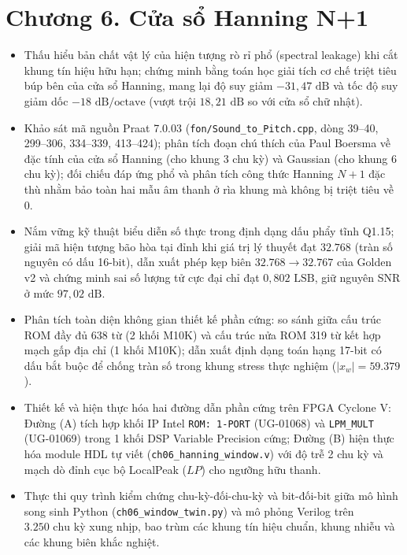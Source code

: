 \providecommand{\todo}[1]{\textcolor{red}{\textbf{[TODO: #1]}}}
\clearpage
{}
\section*{Chương 6. Cửa sổ Hanning N+1}

\begin{learningobj}
\begin{itemize}[leftmargin=1.5em, itemsep=2pt]
    \item Thấu hiểu bản chất vật lý của hiện tượng rò rỉ phổ (spectral leakage) khi cắt khung tín hiệu hữu hạn; chứng minh bằng toán học giải tích cơ chế triệt tiêu búp bên của cửa sổ Hanning, mang lại độ suy giảm $-31{,}47\text{ dB}$ và tốc độ suy giảm dốc $-18\text{ dB/octave}$ (vượt trội $18{,}21\text{ dB}$ so với cửa sổ chữ nhật).
    \item Khảo sát mã nguồn Praat 7.0.03 (\texttt{fon/Sound\_to\_Pitch.cpp}, dòng 39--40, 299--306, 334--339, 413--424); phân tích đoạn chú thích của Paul Boersma về đặc tính của cửa sổ Hanning (cho khung 3 chu kỳ) và Gaussian (cho khung 6 chu kỳ); đối chiếu đáp ứng phổ và phân tích công thức Hanning $N+1$ đặc thù nhằm bảo toàn hai mẫu âm thanh ở rìa khung mà không bị triệt tiêu về $0$.
    \item Nắm vững kỹ thuật biểu diễn số thực trong định dạng dấu phẩy tĩnh Q1.15; giải mã hiện tượng bão hòa tại đỉnh khi giá trị lý thuyết đạt $32.768$ (tràn số nguyên có dấu 16-bit), dẫn xuất phép kẹp biên $32.768 \to 32.767$ của Golden v2 và chứng minh sai số lượng tử cực đại chỉ đạt $0{,}802\text{ LSB}$, giữ nguyên SNR ở mức $97{,}02\text{ dB}$.
    \item Phân tích toàn diện không gian thiết kế phần cứng: so sánh giữa cấu trúc ROM đầy đủ 638 từ (2 khối M10K) và cấu trúc nửa ROM 319 từ kết hợp mạch gấp địa chỉ (1 khối M10K); dẫn xuất định dạng toán hạng 17-bit có dấu bắt buộc để chống tràn số trong khung stress thực nghiệm ($|x_w| = 59.379$).
    \item Thiết kế và hiện thực hóa hai đường dẫn phần cứng trên FPGA Cyclone V: Đường (A) tích hợp khối IP Intel \texttt{ROM: 1-PORT} (UG-01068) và \texttt{LPM\_MULT} (UG-01069) trong 1 khối DSP Variable Precision cứng; Đường (B) hiện thực hóa module HDL tự viết (\texttt{ch06\_hanning\_window.v}) với độ trễ 2 chu kỳ và mạch dò đỉnh cục bộ LocalPeak ($LP$) cho ngưỡng hữu thanh.
    \item Thực thi quy trình kiểm chứng chu-kỳ-đối-chu-kỳ và bit-đối-bit giữa mô hình song sinh Python (\texttt{ch06\_window\_twin.py}) và mô phỏng Verilog trên $3.250\text{ chu kỳ}$ xung nhịp, bao trùm các khung tín hiệu chuẩn, khung nhiễu và các khung biên khắc nghiệt.
\end{itemize}
\end{learningobj}

